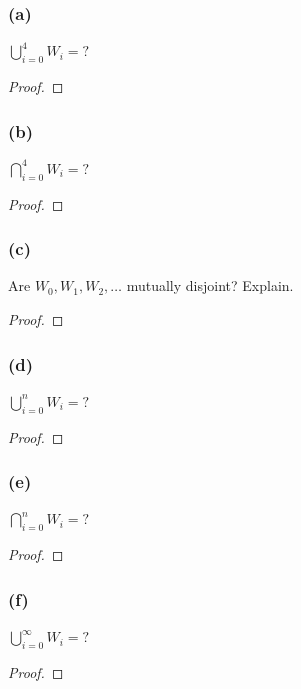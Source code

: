 \documentclass[14pt]{extarticle}
\newcommand{\dps}{\displaystyle}
\begin{document}
\subsubsection{(a)}
\(\dps \bigcup_{i=0}^{4}W_i = ?\)

\begin{proof}

\end{proof}

\subsubsection{(b)}
\(\dps \bigcap_{i=0}^{4}W_i = ?\)

\begin{proof}

\end{proof}

\subsubsection{(c)}
Are \(W_0, W_1, W_2, \ldots\) mutually disjoint? Explain.

\begin{proof}

\end{proof}

\subsubsection{(d)}
\(\dps \bigcup_{i=0}^{n}W_i = ?\)

\begin{proof}

\end{proof}

\subsubsection{(e)}
\(\dps \bigcap_{i=0}^{n}W_i = ?\)

\begin{proof}

\end{proof}

\subsubsection{(f)}
\(\dps \bigcup_{i=0}^{\infty}W_i = ?\)
\begin{proof}

\end{proof}
\end{document}

